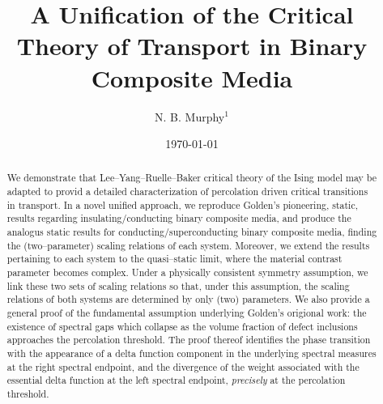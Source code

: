 \documentclass[english,12pt,jmp,graphicx]{revtex4-1}
\begin{document}

\title{A Unification of the Critical Theory of Transport in Binary
  Composite Media} %



\author{N. B. Murphy$^1$}
%


\date{\today}

\begin{abstract}
%
We demonstrate that Lee--Yang--Ruelle--Baker critical theory of the
Ising model may be adapted to provid a detailed characterization of
percolation driven critical transitions in transport. In a novel
unified approach, we reproduce Golden's pioneering, static, results
regarding insulating/conducting binary composite media, and produce
the analogus static results for conducting/superconducting binary
composite media, finding the (two--parameter) scaling relations of
each system. Moreover, we extend the results pertaining to each system
to the quasi--static limit, where the material contrast parameter
becomes complex. Under a physically consistent symmetry assumption, we
link these two sets of scaling relations so that, under this
assumption, the scaling relations of both systems are determined by
only (two) parameters. We also provide a general proof of the
fundamental assumption underlying Golden's origional work: the
existence of spectral gaps which collapse as the volume fraction of
defect inclusions approaches the percolation threshold. The proof
thereof identifies the phase transition with the appearance of a delta
function component in the underlying spectral measures at the right
spectral endpoint, and the divergence of the weight associated with
the essential delta function at the left spectral endpoint,
\emph{precisely} at the percolation threshold.  
%
\end{abstract}
\end{document}
